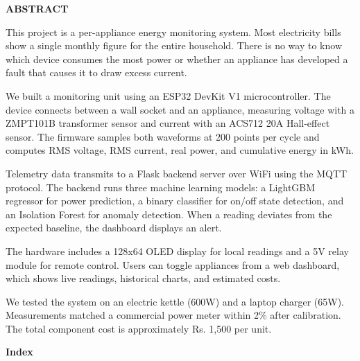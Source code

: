 \documentclass[12pt, a4paper]{article}
\begin{document}
	
	\newpage
	
	\thispagestyle{empty}
	\begin{center}
		{\Large \textbf{ABSTRACT}}\\[1cm]
	\end{center}
	
	This project is a per-appliance energy monitoring system. Most electricity bills show a single monthly figure for the entire household. There is no way to know which device consumes the most power or whether an appliance has developed a fault that causes it to draw excess current.
	
	We built a monitoring unit using an ESP32 DevKit V1 microcontroller. The device connects between a wall socket and an appliance, measuring voltage with a ZMPT101B transformer sensor and current with an ACS712 20A Hall-effect sensor. The firmware samples both waveforms at 200 points per cycle and computes RMS voltage, RMS current, real power, and cumulative energy in kWh.
	
	Telemetry data transmits to a Flask backend server over WiFi using the MQTT protocol. The backend runs three machine learning models: a LightGBM regressor for power prediction, a binary classifier for on/off state detection, and an Isolation Forest for anomaly detection. When a reading deviates from the expected baseline, the dashboard displays an alert.
	
	The hardware includes a 128x64 OLED display for local readings and a 5V relay module for remote control. Users can toggle appliances from a web dashboard, which shows live readings, historical charts, and estimated costs.
	
	We tested the system on an electric kettle (600W) and a laptop charger (65W). Measurements matched a commercial power meter within 2\% after calibration. The total component cost is approximately Rs. 1,500 per unit.
	
	\newpage
	
	\thispagestyle{empty}
	\begin{center}
		{\Large \textbf{Index}}\\[1cm]
	\end{center}
	
\end{document}
